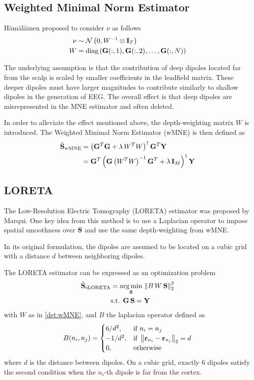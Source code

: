 \subsection{Weighted Minimal Norm Estimator}
\label{sec:wMNE}

H\"{a}m\"{a}l\"{a}inen proposed to consider $\nu$ as follows
\begin{align}
\nu &\sim
\mathcal{N}\left( 
0, 
W^{-1} \otimes \mathbf{I}_T
 \right)
\\
W &=
\text{diag}\left(   \mathbf{G}(:,1), \mathbf{G}(:,2), \dots, \mathbf{G}(:,N)   \right)
\label{det:wMNE}
\end{align}

The underlying assumption is that the contribution of deep dipoles located far from the scalp is scaled by smaller coefficients in the leadfield matrix.
%
These deeper dipoles must have larger magnitudes to contribute similarly to shallow dipoles in the generation of EEG.
%
The overall effect is that deep dipoles are misrepresented in the MNE estimator and often deleted.

In order to alleviate the effect mentioned above, the depth-weighting matrix $W$ is introduced.
%
The Weighted Minimal Norm Estimator (wMNE) is then defined as
\begin{align}
\hat{\mathbf{S}}_\text{wMNE} 
&=
\left( \mathbf{G}^T \mathbf{G} + \lambda\, W^T W \right)^\dagger \mathbf{G}^T \mathbf{Y} \\
&=
\mathbf{G}^T
\left( \mathbf{G} \left( W^T W \right)^{-1} \mathbf{G}^T + \lambda\, \mathbf{I}_M \right)^\dagger \mathbf{Y}
\label{est:wMNE}
\end{align}

\subsection{LORETA}

The Low-Resolution Electric Tomography (LORETA) estimator was proposed by Marqui\cite{sloreta}.
%
One key idea from this method is to use a Laplacian operator to impose spatial smoothness over $\mathbf{S}$ and use the same depth-weighting from wMNE.

In its original formulation, the dipoles are assumed to be located on a cubic grid with a distance $d$ between neighboring dipoles. 

The LORETA estimator can be expressed as an optimization problem
\begin{align}
\hat{\mathbf{S}}_\text{sLORETA} 
&=
\operatorname*{arg\,min}_{\mathbf{S}} \,
\left\lVert  B\, W\, \mathbf{S}  \right\rVert _2^2 
\nonumber \\
&\text{s.t. }
\mathbf{G}\, \mathbf{S} = \mathbf{Y}
\end{align}
with $W$ as in \eqref{det:wMNE}, and $B$ the laplacian operator defined as
\begin{equation}
B(n_i, n_j) =
\begin{cases}
6/d^2, &\text{if } n_i=n_j \\
-1/d^2, &\text{if } \left\lVert \mathbf{r}_{n_i}-\mathbf{r}_{n_j} \right\rVert_2 = d \\
0, &\text{otherwise}
\end{cases}
\end{equation}
where $d$ is the distance between dipoles. On a cubic grid, exactly 6 dipoles satisfy the second condition when the $n_i$-th dipole is far from the cortex.

